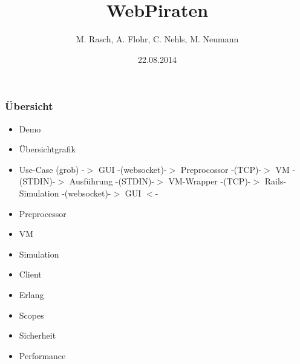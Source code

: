 \documentclass{beamer}
\begin{document}

\title{WebPiraten}  
\author{M. Rasch, A. Flohr, C. Nehls, M. Neumann}
\date{22.08.2014} 

\begin{frame}
\maketitle
\end{frame} 

\begin{frame}
\frametitle{Übersicht}
\tableofcontents
\end{frame}

\begin{frame}
\begin{itemize}
\item Demo
\item Übersichtgrafik
\item Use-Case (grob)\newline
-$>$ GUI -(websocket)-$>$ Preprocossor -(TCP)-$>$ VM -(STDIN)-$>$ Ausführung -(STDIN)-$>$ VM-Wrapper -(TCP)-$>$ Rails-Simulation -(websocket)-$>$ GUI $<$-
\item Preprocessor
\item VM
\item Simulation
\item Client
\item Erlang
\item Scopes
\item Sicherheit
\item Performance
\end{itemize}
\end{frame}









\end{document}
